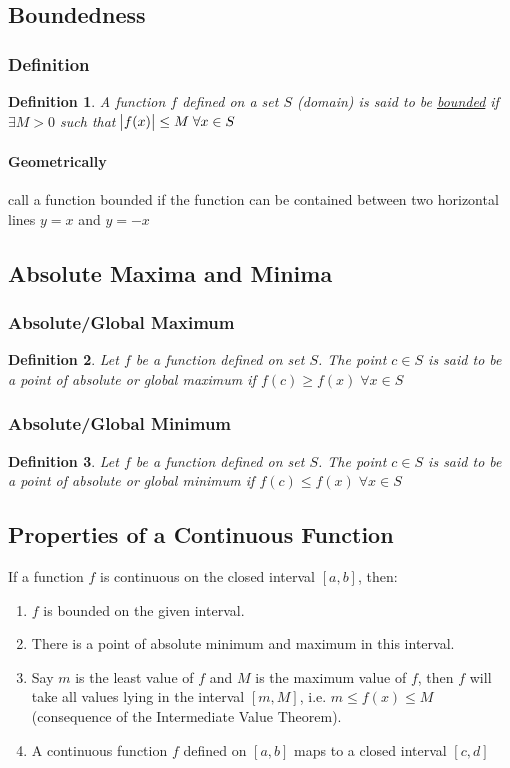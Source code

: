 \documentclass[14]{article}
\newtheorem{define}{Definition}
\theoremstyle{definition}
\theoremstyle{case}
\begin{document}
\subsection{Boundedness}
\subsubsection{Definition}
\begin{define}
A function $f$ defined on a set $S$ (domain) is said to be \underline{bounded} if $\exists M > 0$ such that $\abs{f(x)} \leq M \; \forall x \in S$
\end{define}
\paragraph{Geometrically} call a function bounded if the function can be contained between two horizontal lines $y = x$ and $y = -x$
\pagebreak
\subsection{Absolute Maxima and Minima}
\subsubsection{Absolute/Global Maximum}
\begin{define}
Let $f$ be a function defined on set $S$. The point $c \in S$ is said to be a point of absolute or global maximum if $f(c) \geq f(x) \; \forall x \in S$
\end{define}
\subsubsection{Absolute/Global Minimum}
\begin{define}
Let $f$ be a function defined on set $S$. The point $c \in S$ is said to be a point of absolute or global minimum if $f(c) \leq f(x) \; \forall x \in S$
\end{define}
\subsection{Properties of a Continuous Function}
If a function $f$ is continuous on the closed interval $[a, b]$, then:
\begin{enumerate}
\item $f$ is bounded on the given interval.
\item There is a point of absolute minimum and maximum in this interval.
\item Say $m$ is the least value of $f$ and $M$ is the maximum value of $f$, then $f$ will take all values lying in the interval $[m, M]$, i.e. $m \leq f(x) \leq M$ (consequence of the Intermediate Value Theorem).
\item A continuous function $f$ defined on $[a, b]$ maps to a closed interval $[c, d]$
\end{enumerate}
\end{document}
